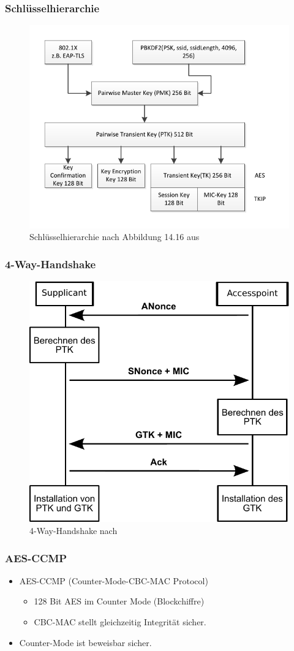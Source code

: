 \documentclass{beamer}
\begin{document}
\begin{frame}
\frametitle{Schlüsselhierarchie}
	\begin{figure}
		\includegraphics[scale=0.75]{figures/key_hier.pdf}
		\caption{Schlüsselhierarchie nach Abbildung 14.16 aus \cite{books/daglib/0008794}}
	\end{figure}
\end{frame}

\begin{frame}
\frametitle{4-Way-Handshake}
\begin{figure}
	\includegraphics[width=0.5\linewidth]{figures/4-way-handshake.pdf}
	\caption{4-Way-Handshake nach \cite{ieee802.11}}
\end{figure}
\end{frame}

\begin{frame}
\frametitle{AES-CCMP}
\begin{itemize}
	\item AES-CCMP (Counter-Mode-CBC-MAC Protocol) 
	\begin{itemize}
		\item 128 Bit AES im Counter Mode (Blockchiffre)
		\item CBC-MAC stellt gleichzeitig Integrität sicher.
	\end{itemize}
	\item Counter-Mode ist beweisbar sicher\cite{bellare}.
\end{itemize}
\end{frame}
\end{document}
